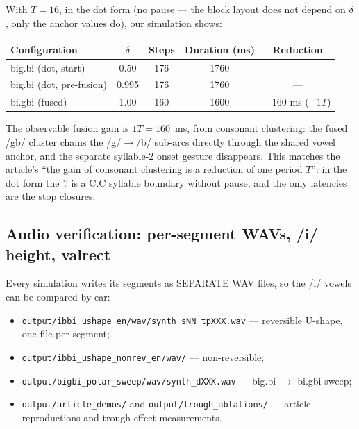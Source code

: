 \documentclass[11pt,a4paper]{article}
\begin{document}
With $T=16$, in the dot form (no pause --- the block layout does not
depend on $\delta$, only the anchor values do), our simulation shows:

\begin{center}
\begin{tabular}{lcccc}
\toprule
\textbf{Configuration} & $\delta$ & Steps & Duration (ms) & Reduction \\
\midrule
big.bi (dot, start) & 0.50 & 176 & 1760 & --- \\
big.bi (dot, pre-fusion) & 0.995 & 176 & 1760 & --- \\
bi.gbi (fused) & 1.00 & 160 & 1600 & $-160$ ms ($-1T$) \\
\bottomrule
\end{tabular}
\end{center}

The observable fusion gain is $1T = 160$~ms, from consonant
clustering: the fused /gb/ cluster chains the /g/$\to$/b/ sub-arcs
directly through the shared vowel anchor, and the separate syllable-2
onset gesture disappears. This matches the article's ``the gain of
consonant clustering is a reduction of one period $T$'': in the dot
form the '.' is a C.C syllable boundary without pause, and the only
latencies are the stop closures.

\subsection{Audio verification: per-segment WAVs, /i/ height, valrect}

Every simulation writes its segments as SEPARATE WAV files, so the
/i/ vowels can be compared by ear:
\begin{itemize}
\item \texttt{output/ibbi\_ushape\_en/wav/synth\_sNN\_tpXXX.wav} ---
  reversible U-shape, one file per segment;
\item \texttt{output/ibbi\_ushape\_nonrev\_en/wav/} --- non-reversible;
\item \texttt{output/bigbi\_polar\_sweep/wav/synth\_dXXX.wav} ---
  big.bi $\to$ bi.gbi sweep;
\item \texttt{output/article\_demos/} and
  \texttt{output/trough\_ablations/} --- article reproductions and
  trough-effect measurements.
\end{itemize}
\end{document}
